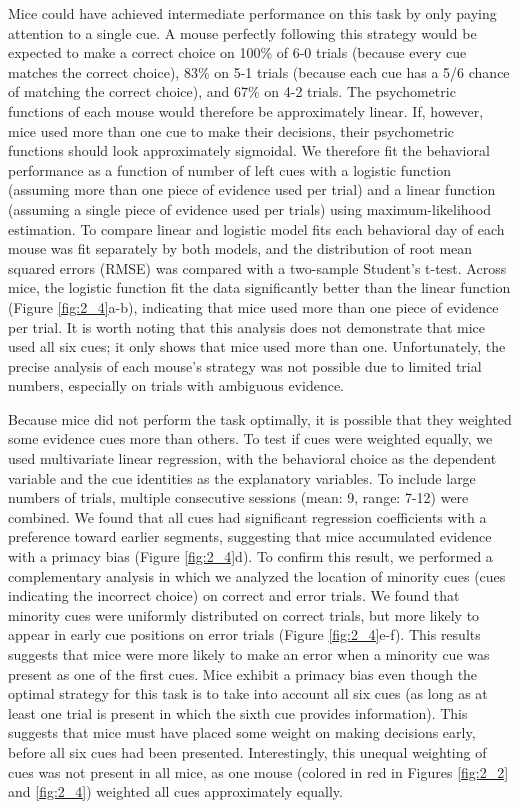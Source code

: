 Mice could have achieved intermediate performance on this task by only paying attention to a single cue. A mouse perfectly following this strategy would be expected to make a correct choice on 100\% of 6-0 trials (because every cue matches the correct choice), 83\% on 5-1 trials (because each cue has a 5/6 chance of matching the correct choice), and 67\% on 4-2 trials. The psychometric functions of each mouse would therefore be approximately linear. If, however, mice used more than one cue to make their decisions, their psychometric functions should look approximately sigmoidal. We therefore fit the behavioral performance as a function of number of left cues with a logistic function (assuming more than one piece of evidence used per trial) and a linear function (assuming a single piece of evidence used per trials) using maximum-likelihood estimation. To compare linear and logistic model fits each behavioral day of each mouse was fit separately by both models, and the distribution of root mean squared errors (RMSE) was compared with a two-sample Student’s t-test. Across mice, the logistic function fit the data significantly better than the linear function (Figure \ref{fig:2_4}a-b), indicating that mice used more than one piece of evidence per trial. It is worth noting that this analysis does not demonstrate that mice used all six cues; it only shows that mice used more than one. Unfortunately, the precise analysis of each mouse's strategy was not possible due to limited trial numbers, especially on trials with ambiguous evidence.

\bigskip
Because mice did not perform the task optimally, it is possible that they weighted some evidence cues more than others. To test if cues were weighted equally, we used multivariate linear regression, with the behavioral choice as the dependent variable and the cue identities as the explanatory variables. To include large numbers of trials, multiple consecutive sessions (mean: 9, range: 7-12) were combined. We found that all cues had significant regression coefficients with a preference toward earlier segments, suggesting that mice accumulated evidence with a primacy bias (Figure \ref{fig:2_4}d). To confirm this result, we performed a complementary analysis in which we analyzed the location of minority cues (cues indicating the incorrect choice) on correct and error trials. We found that minority cues were uniformly distributed on correct trials, but more likely to appear in early cue positions on error trials (Figure \ref{fig:2_4}e-f). This results suggests that mice were more likely to make an error when a minority cue was present as one of the first cues.  Mice exhibit a primacy bias even though the optimal strategy for this task is to take into account all six cues (as long as at least one trial is present in which the sixth cue provides information). This suggests that mice must have placed some weight on making decisions early, before all six cues had been presented. Interestingly, this unequal weighting of cues was not present in all mice, as one mouse (colored in red in Figures \ref{fig:2_2} and \ref{fig:2_4}) weighted all cues approximately equally. 

